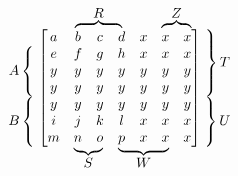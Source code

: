 \documentclass{article}
\newcommand\coolover[2]{\mathrlap{\smash{\overbrace{\phantom{%
    \begin{matrix} #2 \end{matrix}}}^{\mbox{$#1$}}}}#2}
\newcommand\coolunder[2]{\mathrlap{\smash{\underbrace{\phantom{%
    \begin{matrix} #2 \end{matrix}}}_{\mbox{$#1$}}}}#2}
\newcommand\coolleftbrace[2]{%
#1\left\{\vphantom{\begin{matrix} #2 \end{matrix}}\right.}
\newcommand\coolrightbrace[2]{%
\left.\vphantom{\begin{matrix} #1 \end{matrix}}\right\}#2}
\begin{document}
\[ \vphantom{%
    \begin{matrix}
    \overbrace{XYZ}^{\mbox{$R$}}\\ \\ \\ \\ \\ \\ 
    \underbrace{pqr}_{\mbox{$S$}}
    \end{matrix}}%
\begin{matrix}%
\vphantom{a}\\ 
\coolleftbrace{A}{e \\ y\\ y}\\
\coolleftbrace{B}{y \\i \\ m}
\end{matrix}%
\begin{bmatrix}
a & \coolover{R}{b & c & d} & x & \coolover{Z}{x & x}\\
e & f & g & h & x & x & x \\
y & y & y & y & y & y & y \\
y & y & y & y & y & y & y \\
y & y & y & y & y & y & y \\
i & j & k & l & x & x & x \\
m &  \coolunder{S}{n & o}  & \coolunder{W}{p & x & x} & x
\end{bmatrix}%
\begin{matrix}%
\coolrightbrace{x \\ x \\ y\\ y}{T}\\
\coolrightbrace{y \\ y \\ x }{U}
\end{matrix}\]
\end{document}

